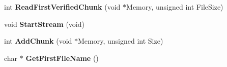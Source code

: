 \begin{DoxyCompactItemize}
\item 
\hypertarget{class_c_tar_a95e4ba103e93671685b5f70057365bc8}{
int {\bfseries ReadFirstVerifiedChunk} (void $\ast$Memory, unsigned int FileSize)}
\label{class_c_tar_a95e4ba103e93671685b5f70057365bc8}

\item 
\hypertarget{class_c_tar_aba1e5ce30e82b5169ad905e94d61a790}{
void {\bfseries StartStream} (void)}
\label{class_c_tar_aba1e5ce30e82b5169ad905e94d61a790}

\item 
\hypertarget{class_c_tar_a0f92155d18c76c19ea819922740532bc}{
int {\bfseries AddChunk} (void $\ast$Memory, unsigned int Size)}
\label{class_c_tar_a0f92155d18c76c19ea819922740532bc}

\item 
\hypertarget{class_c_tar_abdf2006005930057f3f6a84677bde3f7}{
char $\ast$ {\bfseries GetFirstFileName} ()}
\label{class_c_tar_abdf2006005930057f3f6a84677bde3f7}

\end{DoxyCompactItemize}
